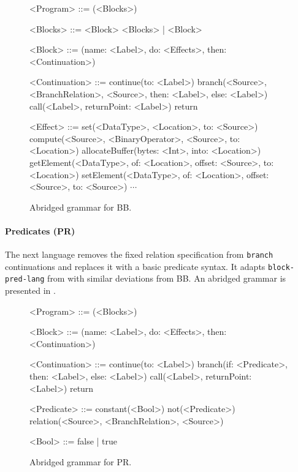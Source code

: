 \documentclass[main.tex]{subfiles}
\begin{document}
\begin{figure}[ht]
	\begin{grammar}
		
		<Program> ::= (<Blocks>)
		
		<Blocks> ::= <Block> <Blocks> | <Block>
		
		<Block> ::= (name: <Label>, do: <Effects>, then: <Continuation>)
		
		<Continuation> ::= continue(to: <Label>)
			\alt branch(<Source>, <BranchRelation>, <Source>, then: <Label>, else: <Label>)
			\alt call(<Label>, returnPoint: <Label>)
			\alt return
		
		<Effect> ::= set(<DataType>, <Location>, to: <Source>)
			\alt compute(<Source>, <BinaryOperator>, <Source>, to: <Location>)
			\alt allocateBuffer(bytes: <Int>, into: <Location>)
			\alt getElement(<DataType>, of: <Location>, offset: <Source>, to: <Location>)
			\alt setElement(<DataType>, of: <Location>, offset: <Source>, to: <Source>)
			\alt $\cdots$
		
	\end{grammar}
	\caption{Abridged grammar for BB.}
	\label{bnf:bb}
\end{figure}

\paragraph{Predicates (PR)} The next language removes the fixed relation specification from \texttt{branch} continuations and replaces it with a basic predicate syntax. It adapts \texttt{block-pred-lang} from \cite{compcourse} with similar deviations from BB. An abridged grammar is presented in .

\begin{figure}[ht]
	\begin{grammar}
		
		<Program> ::= (<Blocks>)
		
		<Block> ::= (name: <Label>, do: <Effects>, then: <Continuation>)
		
		<Continuation> ::= continue(to: <Label>)
			\alt branch(if: <Predicate>, then: <Label>, else: <Label>)
			\alt call(<Label>, returnPoint: <Label>)
			\alt return
			
		<Predicate> ::= constant(<Bool>)
			\alt not(<Predicate>)
			\alt relation(<Source>, <BranchRelation>, <Source>)
			
		<Bool> ::= false | true
		
	\end{grammar}
	\caption{Abridged grammar for PR.}
	\label{bnf:pr}
\end{figure}
\end{document}
